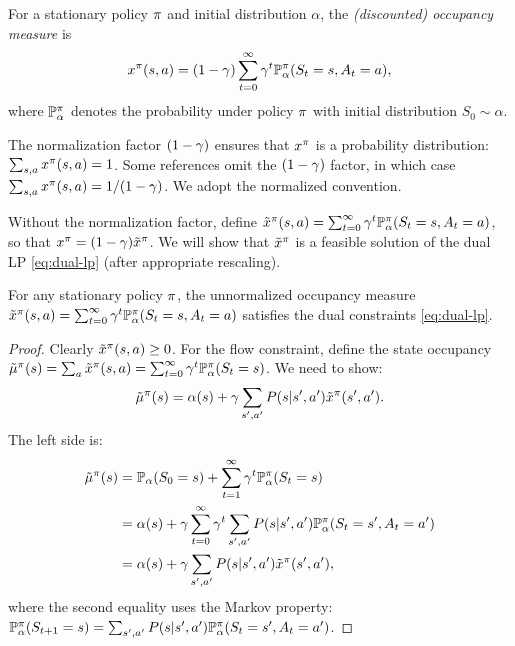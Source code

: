 \documentclass[11pt,a4paper]{article}
\begin{document}
\begin{definition}
\label{def:occupancy}
For a stationary policy $\pi$ and initial distribution $\alpha$,
the \emph{(discounted) occupancy measure} is
\begin{equation}
\label{eq:occupancy-def}
    x^\pi(s,a) = (1 - \gamma) \sum_{t=0}^\infty \gamma^t
    \mathbb{P}^\pi_\alpha(S_t = s, A_t = a),
\end{equation}
where $\mathbb{P}^\pi_\alpha$ denotes the probability under policy
$\pi$ with initial distribution $S_0 \sim \alpha$.
\end{definition}

\begin{remark}
\label{rem:normalization}
The normalization factor $(1-\gamma)$ ensures that $x^\pi$
is a probability distribution: $\sum_{s,a} x^\pi(s,a) = 1$.
Some references omit the $(1-\gamma)$ factor, in which case
$\sum_{s,a} x^\pi(s,a) = 1/(1-\gamma)$. We adopt the
normalized convention.
\end{remark}

Without the normalization factor, define
$\tilde{x}^\pi(s,a) = \sum_{t=0}^\infty \gamma^t
\mathbb{P}^\pi_\alpha(S_t = s, A_t = a)$, so that
$x^\pi = (1-\gamma) \tilde{x}^\pi$. We will show that
$\tilde{x}^\pi$ is a feasible solution of the dual LP
\eqref{eq:dual-lp} (after appropriate rescaling).

\begin{proposition}
\label{prop:occupancy-feasible}
For any stationary policy $\pi$, the unnormalized occupancy
measure $\tilde{x}^\pi(s,a) = \sum_{t=0}^\infty \gamma^t
\mathbb{P}^\pi_\alpha(S_t = s, A_t = a)$ satisfies the dual
constraints \eqref{eq:dual-lp}.
\end{proposition}

\begin{proof}
Clearly $\tilde{x}^\pi(s,a) \geq 0$. For the flow constraint,
define the state occupancy $\tilde{\mu}^\pi(s) = \sum_a
\tilde{x}^\pi(s,a) = \sum_{t=0}^\infty \gamma^t
\mathbb{P}^\pi_\alpha(S_t = s)$. We need to show:
\[
    \tilde{\mu}^\pi(s) = \alpha(s) + \gamma
    \sum_{s',a'} P(s|s',a') \tilde{x}^\pi(s',a').
\]
The left side is:
\begin{align*}
    \tilde{\mu}^\pi(s) &= \mathbb{P}_\alpha(S_0 = s) +
    \sum_{t=1}^\infty \gamma^t \mathbb{P}^\pi_\alpha(S_t = s) \\
    &= \alpha(s) + \gamma \sum_{t=0}^\infty \gamma^t
    \sum_{s',a'} P(s|s',a') \mathbb{P}^\pi_\alpha(S_t = s',
    A_t = a') \\
    &= \alpha(s) + \gamma \sum_{s',a'} P(s|s',a')
    \tilde{x}^\pi(s',a'),
\end{align*}
where the second equality uses the Markov property:
$\mathbb{P}^\pi_\alpha(S_{t+1} = s) = \sum_{s',a'} P(s|s',a')
\mathbb{P}^\pi_\alpha(S_t = s', A_t = a')$.
\end{proof}
\end{document}
